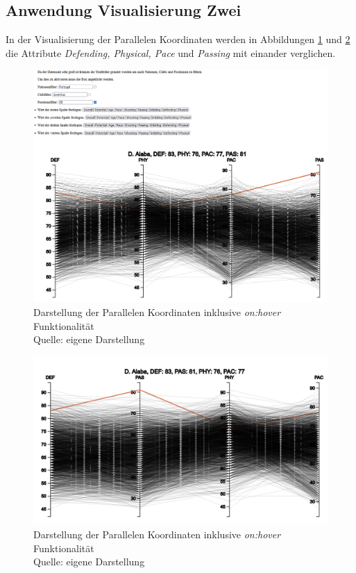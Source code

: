 \documentclass[usegeometry=true]{scrartcl}
\begin{document}
\subsection{Anwendung Visualisierung Zwei}
In der Visualisierung der Parallelen Koordinaten werden in Abbildungen \ref{PK5} und \ref{PK51} die Attribute \textit{Defending, Physical, Pace} und \textit{Passing} mit einander verglichen.

\begin{figure}[h!]
\centering
\includegraphics[scale=0.6]{grafiken/ParalleleKoordinaten5}
\caption{Darstellung der Parallelen Koordinaten inklusive \textit{on:hover} Funktionalität\\ Quelle: eigene Darstellung}
\label{PK5}
\end{figure}

\begin{figure}[h!]
\centering
\includegraphics[scale=0.6]{grafiken/ParalleleKoordinaten51}
\caption{Darstellung der Parallelen Koordinaten inklusive \textit{on:hover} Funktionalität\\ Quelle: eigene Darstellung}
\label{PK51}
\end{figure}
\end{document}
